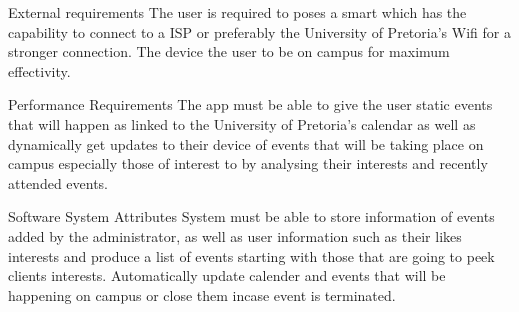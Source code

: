 External requirements
The user is required to poses a smart which has the capability to connect to a ISP or preferably the 
University of Pretoria’s Wifi for a stronger connection. The device the user to be on campus for maximum effectivity.

Performance Requirements
The app must be able to give the user static events that will happen as linked to the University
 of Pretoria’s calendar as well as dynamically get updates to their device of events that will be 
taking place on campus especially those of interest to by analysing their interests and recently attended events. 

Software System Attributes
System must be able to store information of events added by the administrator, as well as user 
information such as their likes interests and produce a list of events starting with those that 
are going to peek clients interests. Automatically update calender and events that will be happening 
on campus or close them incase event is terminated.
